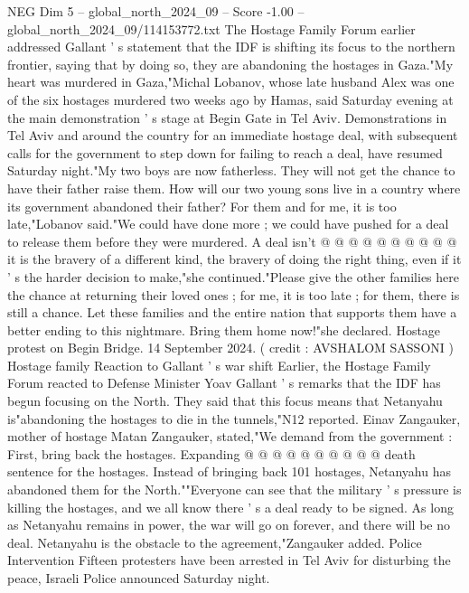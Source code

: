 \begin{textsample}{NEG Dim 5 – global\_north\_2024\_09 – Score -1.00 – global\_north\_2024\_09/114153772.txt}  \label{ex:f5_neg_143}
The Hostage Family Forum earlier addressed Gallant ' s statement that the IDF is shifting its focus to the northern frontier, saying that by doing so, they are abandoning the hostages in Gaza."My heart was murdered in Gaza,"Michal Lobanov, whose late husband Alex was one of the six hostages murdered two weeks ago by Hamas, said Saturday evening at the main demonstration ' s stage at Begin Gate in Tel Aviv.
Demonstrations in Tel Aviv and around the country for an immediate hostage deal, with subsequent calls for the government to step down for failing to reach a deal, have resumed Saturday night."My two boys are now fatherless.
They will not get the chance to have their father raise them.
How will our two young sons live in a country where its government abandoned their father?
For them and for me, it is too late,"Lobanov said."We could have done more ; we could have pushed for a deal to release them before they were murdered.
A deal isn't @ @ @ @ @ @ @ @ @ @ it is the bravery of a different kind, the bravery of doing the right thing, even if it ' s the harder decision to make,"she continued."Please give the other families here the chance at returning their loved ones ; for me, it is too late ; for them, there is still a chance.
Let these families and the entire nation that supports them have a better ending to this nightmare.
Bring them home now!"she declared.
Hostage protest on Begin Bridge. 14 September 2024. ( credit : AVSHALOM SASSONI ) Hostage family Reaction to Gallant ' s war shift Earlier, the Hostage Family Forum reacted to Defense Minister Yoav Gallant ' s remarks that the IDF has begun focusing on the North.
They said that this focus means that Netanyahu is"abandoning the hostages to die in the tunnels,"N12 reported.
Einav Zangauker, mother of hostage Matan Zangauker, stated,"We demand from the government : First, bring back the hostages.
Expanding @ @ @ @ @ @ @ @ @ @ death sentence for the hostages.
Instead of bringing back 101 hostages, Netanyahu has abandoned them for the North.""Everyone can see that the military ' s pressure is killing the hostages, and we all know there ' s a deal ready to be signed.
As long as Netanyahu remains in power, the war will go on forever, and there will be no deal.
Netanyahu is the obstacle to the agreement,"Zangauker added.
Police Intervention Fifteen protesters have been arrested in Tel Aviv for disturbing the peace, Israeli Police announced Saturday night.

\end{textsample}
